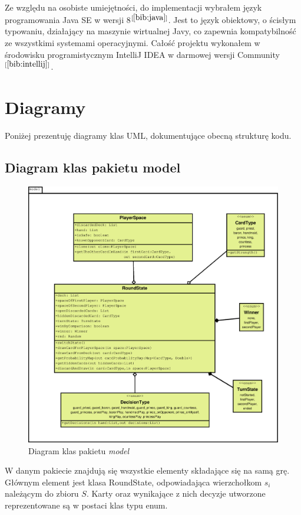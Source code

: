 Ze względu na osobiste umiejętności, do implementacji wybrałem język programowania Java SE w wersji 8$^{[\ref{bib:java}]}$. Jest to język obiektowy, o ścisłym typowaniu, działający na maszynie wirtualnej Javy, co zapewnia kompatybilność ze wszystkimi systemami operacyjnymi. Całość projektu wykonałem w środowisku programistycznym IntelliJ IDEA w darmowej wersji Community$^{[\ref{bib:intellij}]}$.

\section{Diagramy}
Poniżej prezentuję diagramy klas UML, dokumentujące obecną strukturę kodu. 
\subsection{Diagram klas pakietu model}

\begin{figure}[H]
	\centering
	\includegraphics[width=\textwidth]{Resources/diagramKlas_model.eps}
	\caption{Diagram klas pakietu \textit{model}} 
	\label{fig:diagramKlasModel}
\end{figure}

W danym pakiecie znajdują się wszystkie elementy składające się na samą grę. Głównym element jest klasa RoundState, odpowiadająca wierzchołkom $s_i$ należącym do zbioru $S$. Karty oraz wynikające z nich decyzje utworzone reprezentowane są w postaci klas typu enum.

